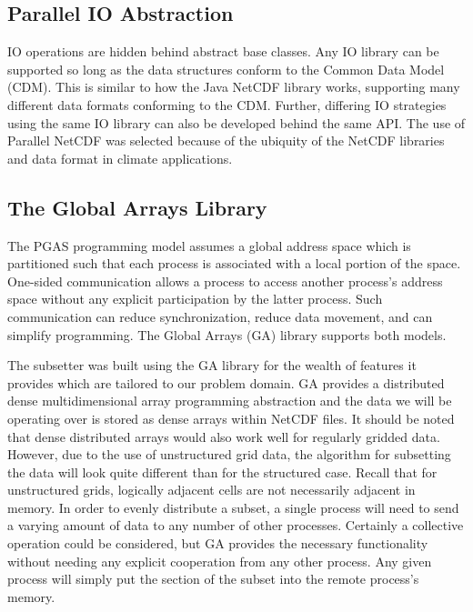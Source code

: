 \subsection{Parallel IO Abstraction}

IO operations are hidden behind abstract base classes.  Any IO library can be
supported so long as the data structures conform to the Common Data Model
(CDM)\cite{CDM}.  This is similar to how the Java NetCDF library works,
supporting many different data formats conforming to the CDM\cite{JavaNetCDF}.
Further, differing IO strategies using the same IO library can also be
developed behind the same API.  The use of Parallel NetCDF was selected
because of the ubiquity of the NetCDF libraries and data format in climate
applications.

\subsection{The Global Arrays Library}

The PGAS programming model assumes a global address space which is partitioned
such that each process is associated with a local portion of the space.
One-sided communication allows a process to access another process's address
space without any explicit participation by the latter process.  Such
communication can reduce synchronization, reduce data movement, and can
simplify programming.  The Global Arrays (GA) library supports both models.

The subsetter was built using the GA library for the wealth of features it
provides which are tailored to our problem domain.  GA provides a distributed
dense multidimensional array programming abstraction and the data we will be
operating over is stored as dense arrays within NetCDF files.  It should be
noted that dense distributed arrays would also work well for regularly gridded
data.  However, due to the use of unstructured grid data, the algorithm for
subsetting the data will look quite different than for the structured case.
Recall that for unstructured grids, logically adjacent cells are not
necessarily adjacent in memory.  In order to evenly distribute a subset, a
single process will need to send a varying amount of data to any number of
other processes.  Certainly a collective operation could be considered, but GA
provides the necessary functionality without needing any explicit cooperation
from any other process.  Any given process will simply put the section of the
subset into the remote process's memory.

